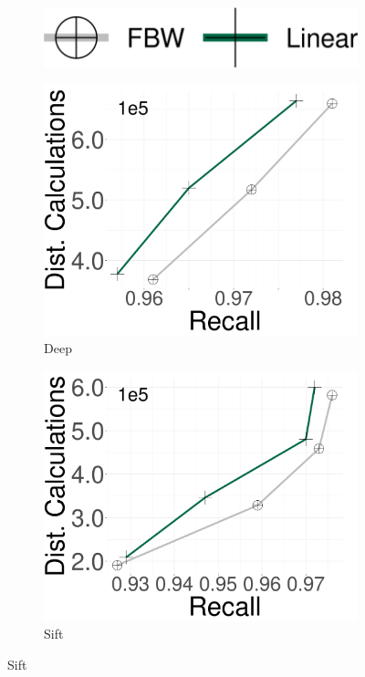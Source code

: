 \begin{figure}[htbp]
    \centering
    \captionsetup{justification=centering}
	\centering
		\captionsetup{justification=centering}
		\captionsetup[subfigure]{justification=centering}
        \begin{subfigure}[b]{\textwidth}
        \centering
 		\includegraphics[width=0.3\columnwidth]{../img/oigas/Linear/legend.png}
    \end{subfigure}
    
            \begin{subfigure}[b]{0.3\textwidth}
            \centering
                \includegraphics[width=\textwidth]{../img/oigas/Linear/deep_DC.png}
        \caption{Deep}
        \label{fig:oigas:linear:deep}
    \end{subfigure}
    \hspace{0.4cm}
             \begin{subfigure}[b]{0.3\textwidth}
                \includegraphics[width=\textwidth]{../img/oigas/Linear/sift_DC.png}
        \caption{Sift}
        \label{fig:oigas:linear:sift}
    \end{subfigure}


\end{figure}

